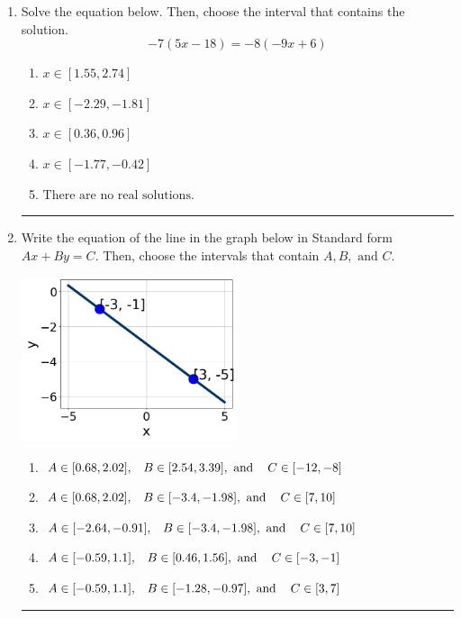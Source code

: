 \documentclass[14pt]{extbook}
\newcommand{\litem}[1]{\item#1\hspace*{-1cm}\rule{\textwidth}{0.4pt}}
\begin{document}
\begin{enumerate}
{\begin{enumerate}[label=\Alph*.]
\end{enumerate} }
\litem{
Solve the equation below. Then, choose the interval that contains the solution.\[ -7(5x -18) = -8(-9x + 6) \]\begin{enumerate}[label=\Alph*.]
\item \( x \in [1.55, 2.74] \)
\item \( x \in [-2.29, -1.81] \)
\item \( x \in [0.36, 0.96] \)
\item \( x \in [-1.77, -0.42] \)
\item \( \text{There are no real solutions.} \)

\end{enumerate} }
\litem{
Write the equation of the line in the graph below in Standard form $Ax+By=C$. Then, choose the intervals that contain $A, B, \text{ and } C$.
\begin{center}
    \includegraphics[width=0.5\textwidth]{../Figures/linearGraphToStandardA.png}
\end{center}
\begin{enumerate}[label=\Alph*.]
\item \( A \in [0.68, 2.02], \hspace{3mm} B \in [2.54, 3.39], \text{ and } \hspace{3mm} C \in [-12, -8] \)
\item \( A \in [0.68, 2.02], \hspace{3mm} B \in [-3.4, -1.98], \text{ and } \hspace{3mm} C \in [7, 10] \)
\item \( A \in [-2.64, -0.91], \hspace{3mm} B \in [-3.4, -1.98], \text{ and } \hspace{3mm} C \in [7, 10] \)
\item \( A \in [-0.59, 1.1], \hspace{3mm} B \in [0.46, 1.56], \text{ and } \hspace{3mm} C \in [-3, -1] \)
\item \( A \in [-0.59, 1.1], \hspace{3mm} B \in [-1.28, -0.97], \text{ and } \hspace{3mm} C \in [3, 7] \)


\end{enumerate}}
\end{enumerate}
\end{document}
